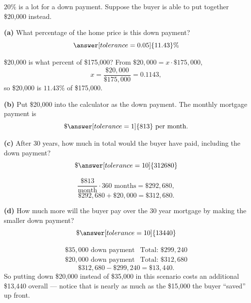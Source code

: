 \documentclass[12pt]{ximera}
\begin{document}
\begin{problem}
$20\%$ is a lot for a down payment. Suppose the buyer is able to put together
\$20,000 instead.

\begin{prompt}
\textbf{(a)} What percentage of the home price is this down payment?
\[
\answer[tolerance=0.05]{11.43}\%
\]
\begin{solution}
\$20,000 is what percent of \$175,000? From $\$20{,}000 = x \cdot \$175{,}000$,
\[
x = \frac{\$20{,}000}{\$175{,}000} = 0.1143,
\]
so \$20,000 is $11.43\%$ of \$175,000.
\end{solution}
\end{prompt}

\begin{prompt}
\textbf{(b)} Put \$20,000 into the calculator as the down payment. The monthly
mortgage payment is
\[
\$\answer[tolerance=1]{813} \text{ per month.}
\]
\end{prompt}

\begin{prompt}
\textbf{(c)} After 30 years, how much in total would the buyer have paid, including
the down payment?
\[
\$\answer[tolerance=10]{312680}
\]
\begin{solution}
\[
\frac{\$813}{\text{month}} \cdot 360 \text{ months} = \$292{,}680,
\]
\[
\$292{,}680 + \$20{,}000 = \$312{,}680.
\]
\end{solution}
\end{prompt}

\begin{prompt}
\textbf{(d)} How much more will the buyer pay over the 30 year mortgage by making the
smaller down payment?
\[
\$\answer[tolerance=10]{13440}
\]
\begin{solution}
\[
\begin{array}{ll}
\$35{,}000 \text{ down payment} & \text{Total: } \$299{,}240 \\
\$20{,}000 \text{ down payment} & \text{Total: } \$312{,}680
\end{array}
\]
\[
\$312{,}680 - \$299{,}240 = \$13{,}440.
\]
So putting down \$20,000 instead of \$35,000 in this scenario costs an additional
\$13,440 overall --- notice that is nearly as much as the \$15,000 the buyer
``saved'' up front.
\end{solution}
\end{prompt}
\end{problem}
\end{document}
